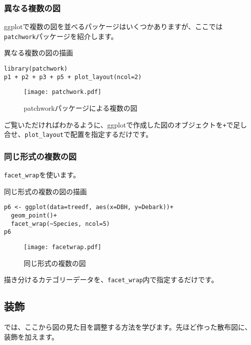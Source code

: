     \subsubsection{異なる複数の図}
ggplotで複数の図を並べるパッケージはいくつかありますが、ここでは\texttt{patchwork}パッケージを紹介します。
\begin{itembox}[l]{異なる複数の図の描画}
\begin{verbatim}
library(patchwork)
p1 + p2 + p3 + p5 + plot_layout(ncol=2)
\end{verbatim}
\end{itembox}
\begin{figure}[htb]
\begin{center}
\graphicspath{{1_basic/figs/}}
\texttt{[image: patchwork.pdf]}\\
\caption{patchworkパッケージによる複数の図}
 \label{patchwork}
\end{center}
\end{figure}
ご覧いただければわかるように、ggplotで作成した図のオブジェクトを\verb|+|で足し合せ、\verb|plot_layout|で配置を指定するだけです。

    \subsubsection{同じ形式の複数の図}
\verb|facet_wrap|を使います。
\begin{itembox}[l]{同じ形式の複数の図の描画}
\begin{verbatim}
p6 <- ggplot(data=treedf, aes(x=DBH, y=Debark))+
  geom_point()+
  facet_wrap(~Species, ncol=5)
p6
\end{verbatim}
\end{itembox}
\begin{figure}[htb]
\begin{center}
\graphicspath{{1_basic/figs/}}
\texttt{[image: facetwrap.pdf]}\\
\caption{同じ形式の複数の図}
 \label{facetwrap}
\end{center}
\end{figure}
描き分けるカテゴリーデータを、\verb|facet_wrap|内で指定するだけです。

\clearpage
  \subsection{装飾}
では、ここから図の見た目を調整する方法を学びます。先ほど作った散布図に、装飾を加えます。
